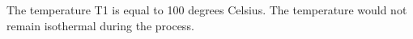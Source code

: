 The temperature T1 is equal to 100 degrees Celsius. The temperature would not remain isothermal during the process.